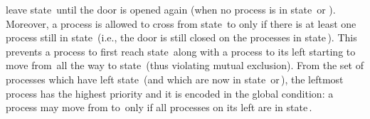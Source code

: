 leave state\, until the door is opened again (when no
process is in state\, or ). %
%
Moreover, a process is allowed to cross from state\, to
 only if there is at least one process still in
state\, (i.e., the door is still closed on the processes
in state\,). %
%
This prevents a process to first reach state\, along with
a process to its left starting to move from\, all the way
to state\, (thus violating mutual exclusion). %
From the set of processes which have left state\, (and
which are now in state\, or\,), the leftmost
process has the highest priority and it is encoded in the global
condition: a process may move from  to\,
only if all processes on its left are in state\,.
%
